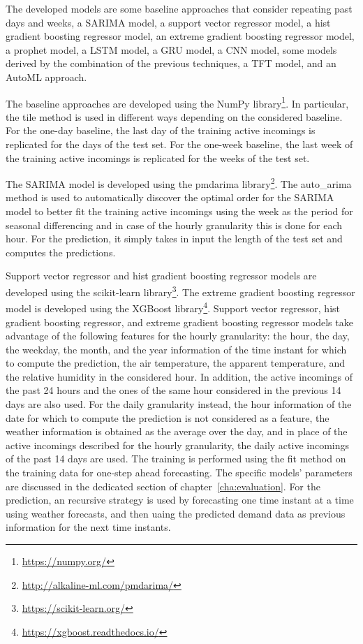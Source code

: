 The developed models are some baseline approaches that consider repeating past days and weeks, a SARIMA model, a support vector regressor model, a hist gradient boosting regressor model, an extreme gradient boosting regressor model, a prophet model, a LSTM model, a GRU model, a CNN model, some models derived by the combination of the previous techniques, a TFT model, and an AutoML approach.

The baseline approaches are developed using the NumPy library\footnote{ \url{https://numpy.org/} }.
In particular, the tile method is used in different ways depending on the considered baseline.
For the one-day baseline, the last day of the training active incomings is replicated for the days of the test set.
For the one-week baseline, the last week of the training active incomings is replicated for the weeks of the test set.

The SARIMA model is developed using the pmdarima library\footnote{ \url{http://alkaline-ml.com/pmdarima/} }.
The auto\_arima method is used to automatically discover the optimal order for the SARIMA model to better fit the training active incomings using the week as the period for seasonal differencing and in case of the hourly granularity this is done for each hour.
For the prediction, it simply takes in input the length of the test set and computes the predictions.

Support vector regressor and hist gradient boosting regressor models are developed using the scikit-learn library\footnote{ \url{https://scikit-learn.org/} }.
The extreme gradient boosting regressor model is developed using the XGBoost library\footnote{ \url{https://xgboost.readthedocs.io/} }.
Support vector regressor, hist gradient boosting regressor, and extreme gradient boosting regressor models take advantage of the following features for the hourly granularity: the hour, the day, the weekday, the month, and the year information of the time instant for which to compute the prediction, the air temperature, the apparent temperature, and the relative humidity in the considered hour.
In addition, the active incomings of the past 24 hours and the ones of the same hour considered in the previous 14 days are also used.
For the daily granularity instead, the hour information of the date for which to compute the prediction is not considered as a feature, the weather information is obtained as the average over the day, and in place of the active incomings described for the hourly granularity, the daily active incomings of the past 14 days are used.
The training is performed using the fit method on the training data for one-step ahead forecasting.
The specific models' parameters are discussed in the dedicated section of chapter~\ref{cha:evaluation}.
For the prediction, an recursive strategy is used by forecasting one time instant at a time using weather forecasts, and then uaing the predicted demand data as previous information for the next time instants.

